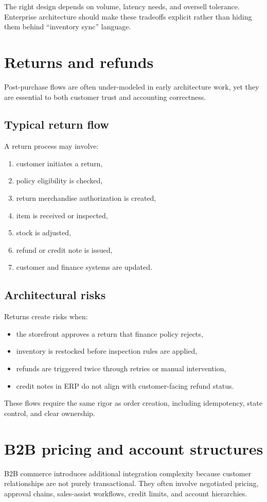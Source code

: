 The right design depends on volume, latency needs, and oversell tolerance.
Enterprise architecture should make these tradeoffs explicit rather than hiding them behind ``inventory sync'' language.

\section{Returns and refunds}
Post-purchase flows are often under-modeled in early architecture work, yet they are essential to both customer trust and accounting correctness.

\subsection{Typical return flow}
A return process may involve:
\begin{enumerate}
  \item customer initiates a return,
  \item policy eligibility is checked,
  \item return merchandise authorization is created,
  \item item is received or inspected,
  \item stock is adjusted,
  \item refund or credit note is issued,
  \item customer and finance systems are updated.
\end{enumerate}

\subsection{Architectural risks}
Returns create risks when:
\begin{itemize}
  \item the storefront approves a return that finance policy rejects,
  \item inventory is restocked before inspection rules are applied,
  \item refunds are triggered twice through retries or manual intervention,
  \item credit notes in ERP do not align with customer-facing refund status.
\end{itemize}

These flows require the same rigor as order creation, including idempotency, state control, and clear ownership.

\section{B2B pricing and account structures}
B2B commerce introduces additional integration complexity because customer relationships are not purely transactional.
They often involve negotiated pricing, approval chains, sales-assist workflows, credit limits, and account hierarchies.

